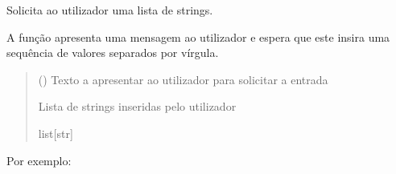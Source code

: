 \documentclass[letterpaper,10pt,portuges]{sphinxmanual}
\begin{document}
\begin{fulllineitems}
\label{\detokenize{main:main.pedir_lista}}
\pysigstartsignatures
\pysiglinewithargsret
{}
{}
{}
\pysigstopsignatures
\sphinxAtStartPar
Solicita ao utilizador uma lista de strings.

\sphinxAtStartPar
A função apresenta uma mensagem ao utilizador e espera que este
insira uma sequência de valores separados por vírgula.
\begin{quote}\begin{description}
\sphinxAtStartPar
{} () \textendash{} Texto a apresentar ao utilizador para solicitar a entrada

\sphinxAtStartPar
Lista de strings inseridas pelo utilizador

\sphinxAtStartPar
list{[}str{]}

\end{description}\end{quote}

\sphinxAtStartPar
Por exemplo:

\begin{sphinxVerbatim}[commandchars=\\\{\}]
\end{sphinxVerbatim}

\end{fulllineitems}

\end{document}
